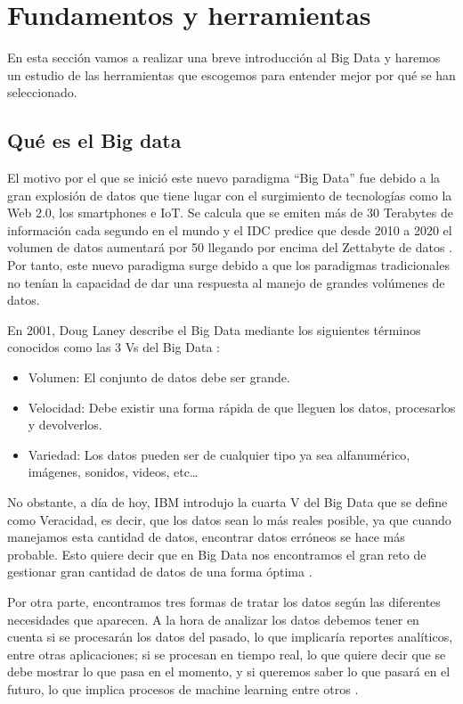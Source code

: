 \section{Fundamentos y herramientas\label{FunAndTools}}

En esta sección vamos a realizar una breve introducción al Big Data y haremos un estudio de las herramientas que escogemos para entender mejor por qué se han seleccionado.\par

\subsection{Qué es el Big data\label{WhatIsBigD}}

El motivo por el que se inició este nuevo paradigma “Big Data” fue debido a la gran explosión de datos que tiene lugar con el surgimiento de tecnologías como la Web 2.0, los smartphones e IoT. Se calcula que se emiten más de 30 Terabytes de información cada segundo en el mundo \cite{BD-2} y el IDC predice que desde 2010 a 2020 el volumen de datos aumentará por 50 llegando por encima del Zettabyte de datos \cite{BD-2}. Por tanto, este nuevo paradigma surge debido a que los paradigmas tradicionales no tenían la capacidad de dar una respuesta al manejo de grandes volúmenes de datos.\par

En 2001, Doug Laney describe el Big Data mediante los siguientes términos conocidos como las 3 Vs del Big Data \cite{BD-4}:

\begin{itemize}
\item Volumen: El conjunto de datos debe ser grande.
\item Velocidad: Debe existir una forma rápida de que lleguen los datos, procesarlos y devolverlos.
\item Variedad: Los datos pueden ser de cualquier tipo ya sea alfanumérico, imágenes, sonidos, videos, etc…
\end{itemize}

No obstante, a día de hoy, IBM introdujo la cuarta V del Big Data que se define como Veracidad, es decir, que los datos sean lo más reales posible, ya que cuando manejamos esta cantidad de datos, encontrar datos erróneos se hace más probable. Esto quiere decir que en Big Data nos encontramos el gran reto de gestionar gran cantidad de datos de una forma óptima \cite{BD-5}.\par

Por otra parte, encontramos tres formas de tratar los datos según las diferentes necesidades que aparecen. A la hora de analizar los datos debemos tener en cuenta si se procesarán los datos del pasado, lo que implicaría reportes analíticos, entre otras aplicaciones; si se procesan en tiempo real, lo que quiere decir que se debe mostrar lo que pasa en el momento, y si queremos saber lo que pasará en el futuro, lo que implica procesos de machine learning entre otros \cite{BD-3}.\par

